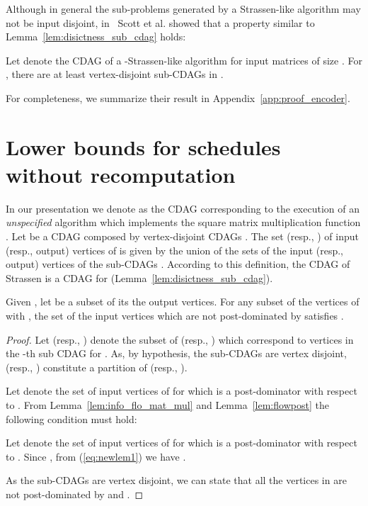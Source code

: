 \documentclass[a4paper,UKenglish]{lipics-v2016}
\begin{document}
Although in general the sub-problems generated by a Strassen-like
algorithm may not be input disjoint, in~\cite{scott2015matrix} Scott
et al. showed that a property similar to
Lemma~\ref{lem:disictness_sub_cdag} holds:

\begin{lemma}\label{lem:vdigraphslike}
Let  denote the CDAG of a
-Strassen-like algorithm for input matrices of size . For , there are at least
 vertex-disjoint sub-CDAGs 
in .
\end{lemma}
For completeness, we summarize their result in
Appendix~\ref{app:proof_encoder}.

\section{Lower bounds for schedules without recomputation}\label{sect:stranore}
In our presentation we denote as  the CDAG corresponding to the execution of an \emph{unspecified} algorithm which implements the square matrix multiplication function . 
Let  be a CDAG composed by  vertex-disjoint CDAGs
. The set  (resp., ) of input (resp., output)
vertices of  is given by the union of the sets of the
input (resp., output) vertices of the  sub-CDAGs . According to this definition, the CDAG of Strassen  is a  CDAG for
 (Lemma~\ref{lem:disictness_sub_cdag}). 

\begin{lemma}\label{lem:newbasenr}
Given , let  be a subset of its the output
vertices. For any subset  of the vertices of 
with , the set  of the input
vertices which are not post-dominated by  satisfies .
\end{lemma}
\begin{proof}
	Let  (resp., ) denote the subset of  (resp., ) which correspond to vertices in the -th sub CDAG  for . As, by hypothesis, the sub-CDAGs  are vertex disjoint,  (resp., ) constitute a partition of  (resp., ). 
	
	Let  denote the set of input vertices of  for which  is a post-dominator with respect to . 
From Lemma~\ref{lem:info_flo_mat_mul} and Lemma~\ref{lem:flowpost} the following condition must hold:
		
	Let  denote the set of input vertices of  for which  is a post-dominator with respect to . Since , from (\ref{eq:newlem1}) we have .
	
	As the sub-CDAGs  are vertex disjoint, we can state that all the vertices in  are not post-dominated by  and
	.
\end{proof}
\end{document}
